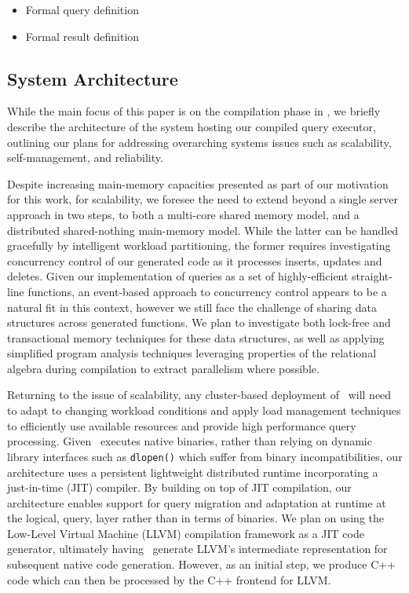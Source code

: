 \begin{itemize}
  \item Formal query definition
  \item Formal result definition
\end{itemize}
 
\subsection{System Architecture}
While the main focus of this paper is on the compilation phase in \compiler, we
briefly describe the architecture of the system hosting our compiled
query executor, outlining our plans for addressing overarching systems issues
such as scalability, self-management, and reliability.

Despite increasing main-memory capacities presented as part of our motivation for
this work, for scalability, we foresee the need to extend beyond a single server
approach in two steps, to both a multi-core shared memory model, and a
distributed shared-nothing main-memory model. While the latter can be handled
gracefully by intelligent workload partitioning, the former requires
investigating concurrency control of our generated code as it processes inserts,
updates and deletes. Given our implementation of queries as a set of
highly-efficient straight-line functions, an event-based approach to concurrency
control appears to be a natural fit in this context, however we still face the
challenge of sharing data structures across generated functions. We plan to
investigate both lock-free and transactional memory techniques for these data
structures, as well as applying simplified program analysis techniques leveraging
properties of the relational algebra during compilation to extract parallelism
where possible.

Returning to the issue of scalability, any cluster-based deployment of \compiler\
will need to adapt to changing workload conditions and apply load management
techniques to efficiently use available resources and provide high performance
query processing. Given \compiler\ executes native binaries, rather than relying
on dynamic library interfaces such as \texttt{dlopen()} which suffer from binary
incompatibilities, our architecture uses a persistent lightweight distributed
runtime incorporating a just-in-time (JIT) compiler. By building on top of JIT
compilation, our architecture enables support for query migration and adaptation
at runtime at the logical, query, layer rather than in terms of binaries. We plan
on using the Low-Level Virtual Machine (LLVM) compilation framework as a JIT code
generator, ultimately having \compiler\ generate LLVM's intermediate
representation for subsequent native code generation. However, as an initial
step, we produce C++ code which can then be processed by the C++ frontend for
LLVM.

